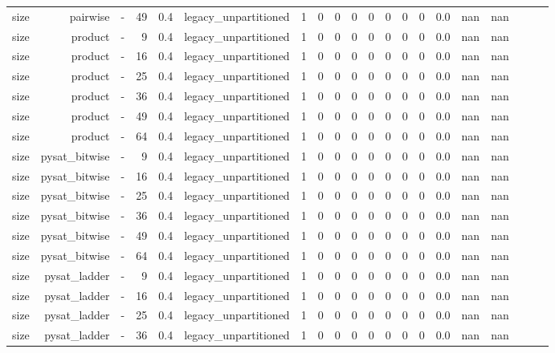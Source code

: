 \begin{tabular}{lrrrrrrrrrrrrrrrrrrr}
size & pairwise & - & 49 & 0.4 & legacy\_unpartitioned & 1 & 0 & 0 & 0 & 0 & 0 & 0 & 0 & 0.0 & nan & nan &  &  &  \\
size & product & - & 9 & 0.4 & legacy\_unpartitioned & 1 & 0 & 0 & 0 & 0 & 0 & 0 & 0 & 0.0 & nan & nan &  &  &  \\
size & product & - & 16 & 0.4 & legacy\_unpartitioned & 1 & 0 & 0 & 0 & 0 & 0 & 0 & 0 & 0.0 & nan & nan &  &  &  \\
size & product & - & 25 & 0.4 & legacy\_unpartitioned & 1 & 0 & 0 & 0 & 0 & 0 & 0 & 0 & 0.0 & nan & nan &  &  &  \\
size & product & - & 36 & 0.4 & legacy\_unpartitioned & 1 & 0 & 0 & 0 & 0 & 0 & 0 & 0 & 0.0 & nan & nan &  &  &  \\
size & product & - & 49 & 0.4 & legacy\_unpartitioned & 1 & 0 & 0 & 0 & 0 & 0 & 0 & 0 & 0.0 & nan & nan &  &  &  \\
size & product & - & 64 & 0.4 & legacy\_unpartitioned & 1 & 0 & 0 & 0 & 0 & 0 & 0 & 0 & 0.0 & nan & nan &  &  &  \\
size & pysat\_bitwise & - & 9 & 0.4 & legacy\_unpartitioned & 1 & 0 & 0 & 0 & 0 & 0 & 0 & 0 & 0.0 & nan & nan &  &  &  \\
size & pysat\_bitwise & - & 16 & 0.4 & legacy\_unpartitioned & 1 & 0 & 0 & 0 & 0 & 0 & 0 & 0 & 0.0 & nan & nan &  &  &  \\
size & pysat\_bitwise & - & 25 & 0.4 & legacy\_unpartitioned & 1 & 0 & 0 & 0 & 0 & 0 & 0 & 0 & 0.0 & nan & nan &  &  &  \\
size & pysat\_bitwise & - & 36 & 0.4 & legacy\_unpartitioned & 1 & 0 & 0 & 0 & 0 & 0 & 0 & 0 & 0.0 & nan & nan &  &  &  \\
size & pysat\_bitwise & - & 49 & 0.4 & legacy\_unpartitioned & 1 & 0 & 0 & 0 & 0 & 0 & 0 & 0 & 0.0 & nan & nan &  &  &  \\
size & pysat\_bitwise & - & 64 & 0.4 & legacy\_unpartitioned & 1 & 0 & 0 & 0 & 0 & 0 & 0 & 0 & 0.0 & nan & nan &  &  &  \\
size & pysat\_ladder & - & 9 & 0.4 & legacy\_unpartitioned & 1 & 0 & 0 & 0 & 0 & 0 & 0 & 0 & 0.0 & nan & nan &  &  &  \\
size & pysat\_ladder & - & 16 & 0.4 & legacy\_unpartitioned & 1 & 0 & 0 & 0 & 0 & 0 & 0 & 0 & 0.0 & nan & nan &  &  &  \\
size & pysat\_ladder & - & 25 & 0.4 & legacy\_unpartitioned & 1 & 0 & 0 & 0 & 0 & 0 & 0 & 0 & 0.0 & nan & nan &  &  &  \\
size & pysat\_ladder & - & 36 & 0.4 & legacy\_unpartitioned & 1 & 0 & 0 & 0 & 0 & 0 & 0 & 0 & 0.0 & nan & nan &  &  &  \\

\end{tabular}
